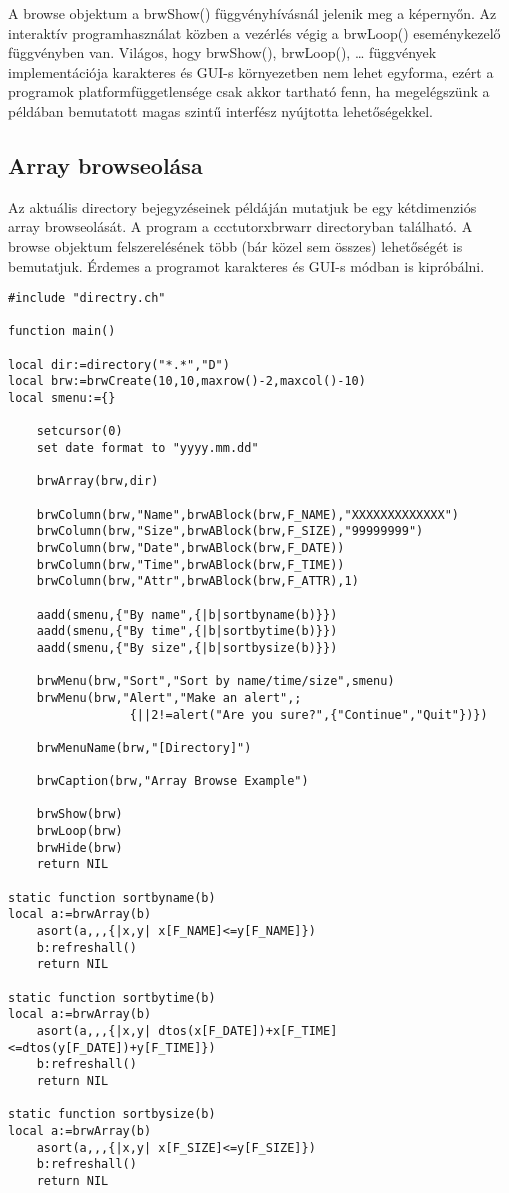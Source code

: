 A browse objektum a brwShow() függvényhívásnál jelenik meg a képernyőn.
Az interaktív programhasználat közben a vezérlés végig a brwLoop()
eseménykezelő függvényben van. Világos, hogy brwShow(), brwLoop(), \ldots 
függvények implementációja karakteres és GUI-s környezetben nem lehet egyforma,
ezért a programok platformfüggetlensége csak akkor tartható fenn,
ha megelégszünk a példában bemutatott magas szintű interfész nyújtotta
lehetőségekkel.


\subsection{Array browseolása}

Az aktuális directory bejegyzéseinek példáján mutatjuk be
egy kétdimenziós array browseolását. A program a 
ccctutor\bslash xbrwarr directoryban található.
A browse objektum felszerelésének több (bár közel sem összes)
lehetőségét is bemutatjuk. Érdemes a programot karakteres és GUI-s
módban is kipróbálni.

\begin{verbatim}
#include "directry.ch"

function main()

local dir:=directory("*.*","D")
local brw:=brwCreate(10,10,maxrow()-2,maxcol()-10)
local smenu:={}

    setcursor(0)
    set date format to "yyyy.mm.dd"

    brwArray(brw,dir)

    brwColumn(brw,"Name",brwABlock(brw,F_NAME),"XXXXXXXXXXXXX")
    brwColumn(brw,"Size",brwABlock(brw,F_SIZE),"99999999")
    brwColumn(brw,"Date",brwABlock(brw,F_DATE))
    brwColumn(brw,"Time",brwABlock(brw,F_TIME))
    brwColumn(brw,"Attr",brwABlock(brw,F_ATTR),1)

    aadd(smenu,{"By name",{|b|sortbyname(b)}})
    aadd(smenu,{"By time",{|b|sortbytime(b)}})
    aadd(smenu,{"By size",{|b|sortbysize(b)}})
    
    brwMenu(brw,"Sort","Sort by name/time/size",smenu)
    brwMenu(brw,"Alert","Make an alert",;
                 {||2!=alert("Are you sure?",{"Continue","Quit"})})
    
    brwMenuName(brw,"[Directory]")
    
    brwCaption(brw,"Array Browse Example")

    brwShow(brw)
    brwLoop(brw)
    brwHide(brw)
    return NIL

static function sortbyname(b)    
local a:=brwArray(b)
    asort(a,,,{|x,y| x[F_NAME]<=y[F_NAME]})
    b:refreshall()
    return NIL
    
static function sortbytime(b)    
local a:=brwArray(b)
    asort(a,,,{|x,y| dtos(x[F_DATE])+x[F_TIME]<=dtos(y[F_DATE])+y[F_TIME]})
    b:refreshall()
    return NIL

static function sortbysize(b)    
local a:=brwArray(b)
    asort(a,,,{|x,y| x[F_SIZE]<=y[F_SIZE]})
    b:refreshall()
    return NIL
\end{verbatim}


